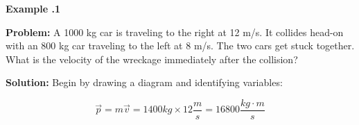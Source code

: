 	 \begin{mdframed}[backgroundcolor=blue!10!white]
	\begin{center}
	\textbf{Example \thesection.1}	
	\end{center}
	
	\textbf{Problem: } A 1000 kg car is traveling to the right at 12 m/s.  It collides head-on with an 800 kg car traveling to the left at 8 m/s.  The two cars get stuck together.  What is the velocity of the wreckage immediately after the collision?
	
	\vspace{0.1in}
	
	\textbf{Solution:} 
	Begin by drawing a diagram and identifying variables:
	
	
	\begin{equation*}
		\vec{p} = m \vec{v} = 1400 kg \times 12 \frac{m}{s} = 16800 \frac{kg\cdot m}{s}
	\end{equation*}
	
\end{mdframed}
\vspace{0.1in}

	


